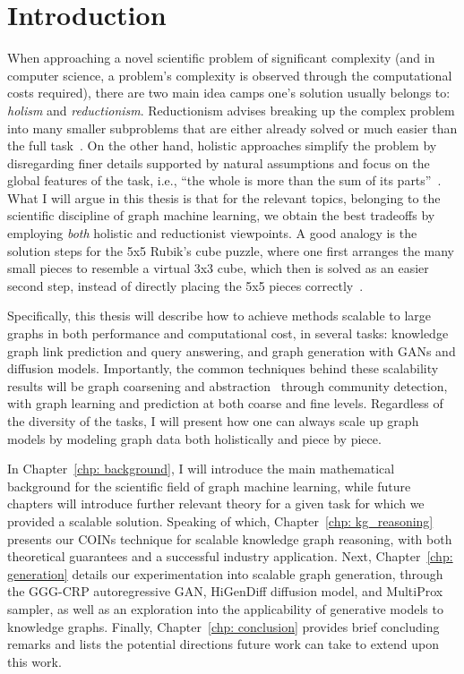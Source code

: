 \chapter{Introduction}
\label{chp: introduction}

When approaching a novel scientific problem of significant complexity (and in computer science, a problem's complexity is observed through the computational costs required), there are two main idea camps one's solution usually belongs to: \emph{holism} and \emph{reductionism}. Reductionism advises breaking up the complex problem into many smaller subproblems that are either already solved or much easier than the full task~\cite{doniger_merriam-websters_1999, kricheldorf_getting_2016}. On the other hand, holistic approaches simplify the problem by disregarding finer details supported by natural assumptions and focus on the global features of the task, i.e., \enquote{the whole is more than the sum of its parts}~\cite{marshall_unity_2002, noauthor_what_2022}. What I will argue in this thesis is that for the relevant topics, belonging to the scientific discipline of graph machine learning, we obtain the best tradeoffs by employing \emph{both} holistic and reductionist viewpoints. A good analogy is the solution steps for the 5x5 Rubik's cube puzzle, where one first arranges the many small pieces to resemble a virtual 3x3 cube, which then is solved as an easier second step, instead of directly placing the 5x5 pieces correctly~\cite{guangzhou_ganyuan_intelligent_technology_co_ltd_5x5_nodate}.

Specifically, this thesis will describe how to achieve methods scalable to large graphs in both performance and computational cost, in several tasks: knowledge graph link prediction and query answering, and graph generation with GANs and diffusion models. Importantly, the common techniques behind these scalability results will be graph coarsening and abstraction~\cite{boneva_graph_2007}  through community detection, with graph learning and prediction at both coarse and fine levels. Regardless of the diversity of the tasks, I will present how one can always scale up graph models by modeling graph data both holistically and piece by piece.

In Chapter~\ref{chp: background}, I will introduce the main mathematical background for the scientific field of graph machine learning, while future chapters will introduce further relevant theory for a given task for which we provided a scalable solution. Speaking of which, Chapter~\ref{chp: kg_reasoning} presents our COINs technique for scalable knowledge graph reasoning, with both theoretical guarantees and a successful industry application. Next, Chapter~\ref{chp: generation} details our experimentation into scalable graph generation, through the GGG-CRP autoregressive GAN, HiGenDiff diffusion model, and MultiProx sampler, as well as an exploration into the applicability of generative models to knowledge graphs. Finally, Chapter~\ref{chp: conclusion} provides brief concluding remarks and lists the potential directions future work can take to extend upon this work.